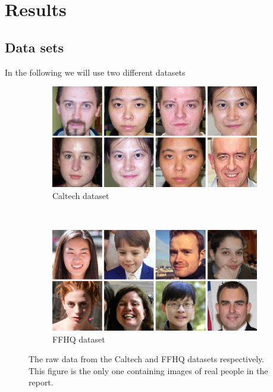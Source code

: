 \chapter{Results}

\section{Data sets}
In the following we will use two different datasets

\begin{figure}
    \centering
    \begin{subfigure}[b]{0.45\textwidth}
        \includegraphics[width=\textwidth]{fig/data/caltech}
        \caption{ Caltech dataset}
    \end{subfigure}
    ~
    \begin{subfigure}[b]{0.45\textwidth}
        \includegraphics[width=\textwidth]{fig/data/ffhq}
        \caption{FFHQ dataset}
    \end{subfigure}

    \caption{The raw data from the Caltech and FFHQ datasets respectively. This figure is the only one containing images of real people in the report.}
    \label{rawdata}
\end{figure}


